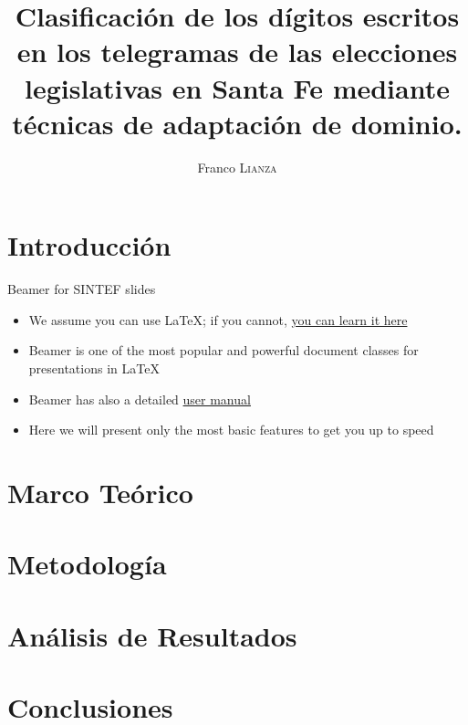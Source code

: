 \documentclass{beamer}
\title{Clasificación de los dígitos escritos en los telegramas de las elecciones legislativas en Santa Fe mediante técnicas de adaptación de dominio.}
\author{Franco \textsc{Lianza}}
\newcommand{\hrefcol}[2]{\textcolor{cyan}{\href{#1}{#2}}}
\begin{document}
\maketitle

\section{Introducción}

\begin{frame}{Beamer for SINTEF slides}
      \begin{itemize}
            \item We assume you can use \LaTeX; if you cannot, \hrefcol{http://en.wikibooks.org/wiki/LaTeX/}{you can learn it here}
            \item Beamer is one of the most popular and powerful document classes for presentations in \LaTeX
            \item Beamer has also a detailed
                  \hrefcol{http://www.ctan.org/tex-archive/macros/latex/contrib/beamer/doc/beameruserguide.pdf}{user manual}
            \item Here we will present only the most basic features to get you up to speed
      \end{itemize}
\end{frame}

\section{Marco Teórico}
\section{Metodología}
\section{Análisis de Resultados}
\section{Conclusiones}

\backmatter
\end{document}
